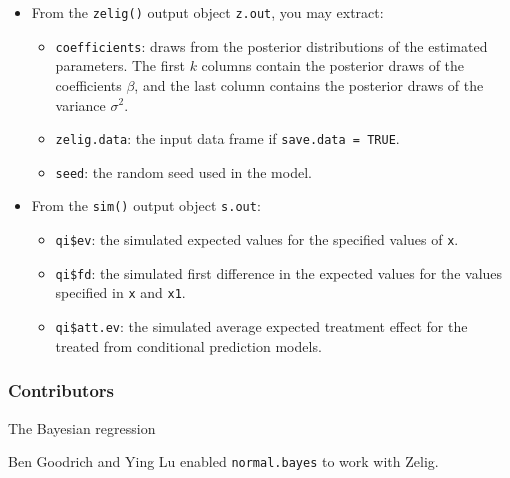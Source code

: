 \begin{itemize}
\item From the \texttt{zelig()} output object \texttt{z.out}, you may extract:

\begin{itemize}
\item \texttt{coefficients}: draws from the posterior distributions
of the estimated parameters. The first $k$ columns contain the posterior draws
of the coefficients $\beta$, and the last column contains the posterior draws 
of the variance $\sigma^2$.

   \item {\tt zelig.data}: the input data frame if {\tt save.data = TRUE}.  
\item \texttt{seed}: the random seed used in the model.

\end{itemize}

\item From the \texttt{sim()} output object \texttt{s.out}:

\begin{itemize}
\item \texttt{qi\$ev}: the simulated expected values for the specified
values of \texttt{x}.

\item \texttt{qi\$fd}: the simulated first difference in the expected
values for the values specified in \texttt{x} and \texttt{x1}.

\item \texttt{qi\$att.ev}: the simulated average expected treatment effect
for the treated from conditional prediction models.

\end{itemize}
\end{itemize}

\subsubsection{Contributors}
The Bayesian regression 

\noindent Ben Goodrich and Ying Lu enabled \texttt{normal.bayes} to work with Zelig.

